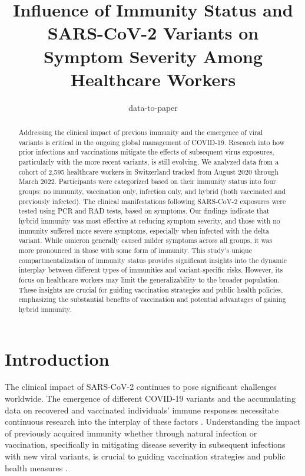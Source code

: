 \documentclass[11pt]{article}
\title{Influence of Immunity Status and SARS-CoV-2 Variants on Symptom Severity Among Healthcare Workers}
\author{data-to-paper}
\begin{document}
\maketitle
\begin{abstract}
Addressing the clinical impact of previous immunity and the emergence of viral variants is critical in the ongoing global management of COVID-19. Research into how prior infections and vaccinations mitigate the effects of subsequent virus exposures, particularly with the more recent variants, is still evolving. We analyzed data from a cohort of 2,595 healthcare workers in Switzerland tracked from August 2020 through March 2022. Participants were categorized based on their immunity status into four groups: no immunity, vaccination only, infection only, and hybrid (both vaccinated and previously infected). The clinical manifestations following SARS-CoV-2 exposures were tested using PCR and RAD tests, based on symptoms. Our findings indicate that hybrid immunity was most effective at reducing symptom severity, and those with no immunity suffered more severe symptoms, especially when infected with the delta variant. While omicron generally caused milder symptoms across all groups, it was more pronounced in those with some form of immunity. This study's unique compartmentalization of immunity status provides significant insights into the dynamic interplay between different types of immunities and variant-specific risks. However, its focus on healthcare workers may limit the generalizability to the broader population. These insights are crucial for guiding vaccination strategies and public health policies, emphasizing the substantial benefits of vaccination and potential advantages of gaining hybrid immunity.
\end{abstract}
\section*{Introduction}

The clinical impact of SARS-CoV-2 continues to pose significant challenges worldwide. The emergence of different COVID-19 variants and the accumulating data on recovered and vaccinated individuals' immune responses necessitate continuous research into the interplay of these factors \cite{Lee2022SARSCoV2VI, Levin2021WaningIH, Weigang2021WithinhostEO}. Understanding the impact of previously acquired immunity whether through natural infection or vaccination, specifically in mitigating disease severity in subsequent infections with new viral variants, is crucial to guiding vaccination strategies and public health measures \cite{Lavine2021ImmunologicalCG, Jiang2021LastingAA, Reynolds2022ImmuneBB}.
\end{document}
